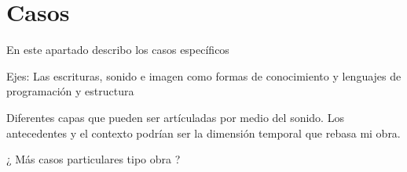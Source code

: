 \chapter{Casos}

En este apartado describo los casos específicos

Ejes: Las escrituras, sonido e imagen como formas de conocimiento y lenguajes de programación y estructura

Diferentes capas que pueden ser artículadas por medio del sonido. Los antecedentes y el contexto podrían ser la dimensión temporal que rebasa mi obra. 

¿ Más casos particulares tipo obra ? 
